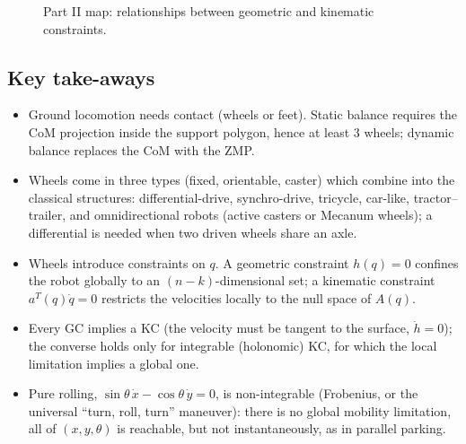 \documentclass[11pt,a4paper]{article}
\theoremstyle{definition}
\theoremstyle{plain}
\theoremstyle{remark}
\begin{document}
\begin{figure}[H]
\centering
{}
\caption{Part II map: relationships between geometric and kinematic constraints.}
\end{figure}
 
\subsection{Key take-aways}
\begin{itemize}
  \item Ground locomotion needs contact (wheels or feet). Static balance requires the CoM projection inside the support polygon, hence at least 3 wheels; dynamic balance replaces the CoM with the ZMP.
  \item Wheels come in three types (fixed, orientable, caster) which combine into the classical structures: differential-drive, synchro-drive, tricycle, car-like, tractor--trailer, and omnidirectional robots (active casters or Mecanum wheels); a differential is needed when two driven wheels share an axle.
  \item Wheels introduce constraints on $q$. A geometric constraint $h(q)=0$ confines the robot globally to an $(n-k)$-dimensional set; a kinematic constraint $a^{T}(q)\dot q=0$ restricts the velocities locally to the null space of $A(q)$.
  \item Every GC implies a KC (the velocity must be tangent to the surface, $\dot h=0$); the converse holds only for integrable (holonomic) KC, for which the local limitation implies a global one.
  \item Pure rolling, $\sin\theta\,\dot x-\cos\theta\,\dot y=0$, is non-integrable (Frobenius, or the universal ``turn, roll, turn'' maneuver): there is no global mobility limitation, all of $(x,y,\theta)$ is reachable, but not instantaneously, as in parallel parking.
\end{itemize}
\end{document}
